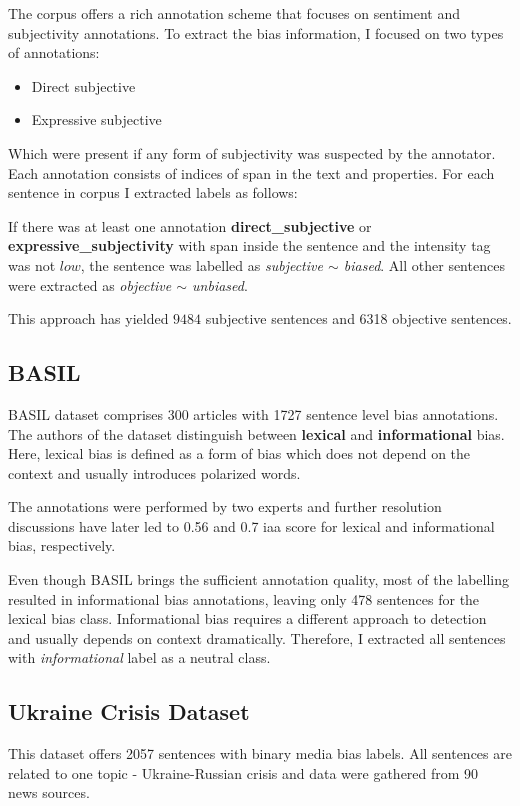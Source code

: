 The corpus offers a rich annotation scheme \cite{wiebe2005annotating} that focuses on sentiment and subjectivity annotations.
\newpage
To extract the bias information, I focused on two types of annotations:
\begin{itemize}
    \item Direct subjective
    \item Expressive subjective
\end{itemize}
Which were present if any form of subjectivity was suspected by the annotator. Each annotation consists of indices of span in the text and properties. For each sentence in corpus I extracted labels as follows:

If there was at least one annotation \textbf{direct\_subjective} or \textbf{expressive\_subjectivity} with span inside the sentence and the intensity tag was not $low$, the sentence was labelled as \textit{subjective $\sim$ biased}. All other sentences were extracted as \textit{objective $\sim$ unbiased}.

This approach has yielded $9484$ subjective sentences and 6318 objective sentences.




\subsection{BASIL}
BASIL dataset \cite{fan2019plain} comprises 300 articles with 1727 sentence level bias annotations. The authors of the dataset distinguish between \textbf{lexical} and \textbf{informational} bias. Here, lexical bias is defined as a form of bias which does not depend on the context and usually introduces polarized words.

The annotations were performed by two experts and further resolution discussions have later led to 0.56 and 0.7 \Gls{iaa} score for lexical and informational bias, respectively.

Even though BASIL brings the sufficient annotation quality, most of the labelling resulted in informational bias annotations, leaving only 478 sentences for the lexical bias class. Informational bias requires a different approach to detection \cite{van2020context} and usually depends on context dramatically. Therefore, I extracted all sentences with \textit{informational} label as a neutral class.




\subsection{Ukraine Crisis Dataset}
This dataset \cite{farber2020multidimensional} offers 2057 sentences with binary media bias labels. All sentences are related to one topic - Ukraine-Russian crisis and data were gathered from 90 news sources.

